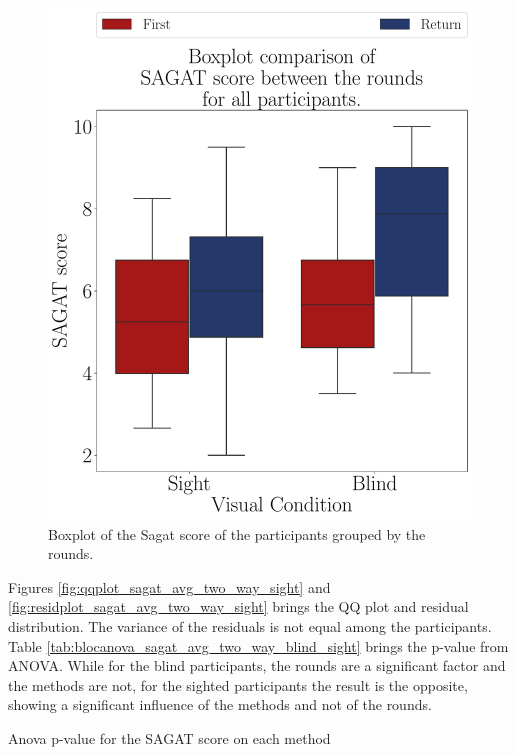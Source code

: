 \begin{figure}[!htb]
\begin{minipage}{0.45\textwidth}
        \includegraphics[width = \linewidth]{Resultados/Sagat/Figuras/pdf/boxplot_sagat_4_rounds.pdf}
        \caption{Boxplot of the Sagat score of the participants grouped by the rounds.}
        \label{fig:boxplot_sagat_4_rounds}
    \end{minipage}
\end{figure}

Figures \ref{fig:qqplot_sagat_avg_two_way_sight} and \ref{fig:residplot_sagat_avg_two_way_sight} brings the QQ plot and residual distribution. The variance of the residuals is not equal among the participants. Table \ref{tab:blocanova_sagat_avg_two_way_blind_sight} brings the p-value from ANOVA. While for the blind participants, the rounds are a significant factor and the methods are not, for the sighted participants the result is the opposite, showing a significant influence of the methods and not of the rounds.

\begin{table}[!htb]
    \caption{Anova p-value for the SAGAT score on each method}
    \label{tab:blocanova_sagat_avg_two_way_blind_sight}
\begin{minipage}{0.45\textwidth}
    
\end{minipage}
\begin{minipage}{0.45\textwidth}
        
\end{minipage}
\end{table}


